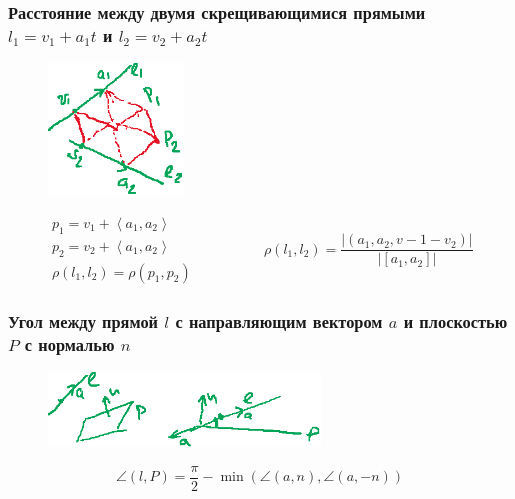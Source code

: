 \subsubsection{Расстояние между двумя скрещивающимися прямыми $l_1 = v_1 + a_1 t$ и $l_2 = v_2 + a_2 t$}

{
\begin{figure}
    \vspace{-10pt}
    \includegraphics[height=3.5cm]{lecture27_drawing_3}
\end{figure}

\begin{equation*}
    \begin{gathered}
        p_1 = v_1 + \left< a_1, a_2 \right> \\
        p_2 = v_2 + \left< a_1, a_2 \right> \\
        \rho(l_1, l_2) = \rho(p_1, p_2)
    \end{gathered}
    \hspace{2cm}
    \rho(l_1, l_2) = \frac{\left|(a_1, a_2, v-1 - v_2)\right|}{\left|[a_1, a_2]\right|}
\end{equation*}
\vspace{1.5cm}
}


\subsubsection{Угол между прямой $l$ с направляющим вектором $a$ и плоскостью $P$ с нормалью $n$}

{
\begin{figure}
    \vspace{-10pt}
    \includegraphics[height=2cm]{lecture27_drawing_4}
\end{figure}

\begin{equation*}
    \angle(l, P) = \frac{\pi}{2} - \min\left(\angle(a, n), \angle(a, -n)\right)
\end{equation*}
\vspace{0.5cm}
}


